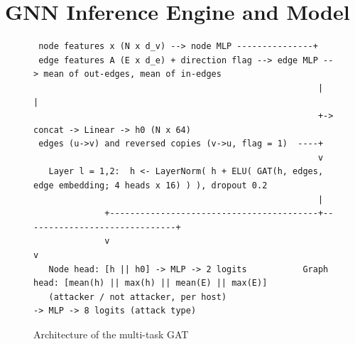 \section{GNN Inference Engine and Model}

\begin{figure}[htbp]
\centering
\scriptsize
\begin{verbatim}
 node features x (N x d_v) --> node MLP ---------------+
 edge features A (E x d_e) + direction flag --> edge MLP --> mean of out-edges, mean of in-edges
                                                        |                 |
                                                        +-> concat -> Linear -> h0 (N x 64)
 edges (u->v) and reversed copies (v->u, flag = 1)  ----+
                                                        v
   Layer l = 1,2:  h <- LayerNorm( h + ELU( GAT(h, edges, edge embedding; 4 heads x 16) ) ), dropout 0.2
                                                        |
              +-----------------------------------------+------------------------------+
              v                                                                         v
   Node head: [h || h0] -> MLP -> 2 logits           Graph head: [mean(h) || max(h) || mean(E) || max(E)]
   (attacker / not attacker, per host)                           -> MLP -> 8 logits (attack type)
\end{verbatim}
\caption{Architecture of the multi-task GAT}
\label{fig:gnn}
\end{figure}

